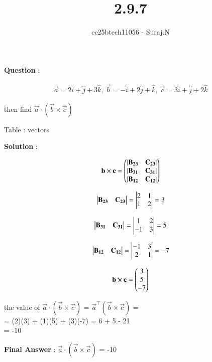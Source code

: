 \documentclass[journal,12pt,onecolumn]{IEEEtran}
\theoremstyle{remark}
\begin{document}
\title{2.9.7}
\author{ee25btech11056 - Suraj.N}
\maketitle
\renewcommand{\thefigure}{\theenumi}
\renewcommand{\thetable}{\theenumi}

\textbf{Question} :  

\begin{align*}
\vec{a}=2\hat{i}+\hat{j}+3\hat{k},\ \vec{b}=-\hat{i}+2\hat{j}+\hat{k},\ \vec{c}=3\hat{i}+\hat{j}+2\hat{k}
\end{align*}

\begin{center}
then find \(\vec{a}\cdot(\vec{b}\times\vec{c})\)
\end{center}

\begin{table}[h!]
  \centering
  
  \caption*{Table : vectors}
  \label{2.9.7}
\end{table}

\textbf{Solution} :

\begin{align*}
\mathbf{b} \times \mathbf{c} = 
\begin{pmatrix}
|\mathbf{B_{23}} & \mathbf{C_{23}}| \\
|\mathbf{B_{31}} & \mathbf{C_{31}}| \\
|\mathbf{B_{12}} & \mathbf{C_{12}}|
\end{pmatrix}
\end{align*}

\begin{align*}
\begin{vmatrix}\mathbf{B_{23}} & \mathbf{C_{23}}\end{vmatrix} = \begin{vmatrix}2 & 1\\1 & 2\end{vmatrix} = 3
\end{align*}

\begin{align*}
\begin{vmatrix}\mathbf{B_{31}} & \mathbf{C_{31}}\end{vmatrix} = \begin{vmatrix}1 & 2\\-1 & 3\end{vmatrix} = 5
\end{align*}

\begin{align*}
\begin{vmatrix}\mathbf{B_{12}} & \mathbf{C_{12}}\end{vmatrix} = \begin{vmatrix}-1 & 3\\2 & 1\end{vmatrix} = -7
\end{align*}

\begin{align*}
  \mathbf{b} \times \mathbf{c} = \begin{pmatrix}3\\5\\-7\end{pmatrix}
\end{align*}

\begin{center}
the value of \(\vec{a}\cdot(\vec{b}\times\vec{c})\) = $\vec{a}^\top(\vec{b}\times\vec{c})$ = \\
= (2)(3) + (1)(5) + (3)(-7) 
= 6 + 5 - 21\\
= -10

\textbf{Final Answer} : \(\vec{a}\cdot(\vec{b}\times\vec{c})\)  = -10 
\end{center}
\end{document}
